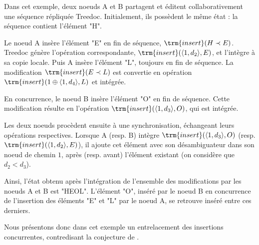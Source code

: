 Dans cet exemple, deux noeuds A et B partagent et éditent collaborativement une séquence répliquée Treedoc.
Initialement, ils possèdent le même état : la séquence contient l'élément "H".

Le noeud A insère l'élément "E" en fin de séquence, \ie $\trm{insert}(H \prec E)$.
Treedoc génère l'opération correspondante, $\trm{insert}(\langle 1,d_2 \rangle, E)$, et l'intègre à sa copie locale.
Puis A insère l'élément "L", toujours en fin de séquence.
La modification $\trm{insert}(E \prec L)$ est convertie en opération $\trm{insert}(1 \oplus \langle 1,d_4 \rangle, L)$ et intégrée.

En concurrence, le noeud B insère l'élément "O" en fin de séquence.
Cette modification résulte en l'opération $\trm{insert}(\langle 1,d_3 \rangle, O)$, qui est intégrée.

Les deux noeuds procèdent ensuite à une synchronisation, échangeant leurs opérations respectives.
Lorsque A (resp. B) intègre $\trm{insert}(\langle 1,d_3 \rangle, O)$ (resp. $\trm{insert}(\langle 1,d_2 \rangle, E)$), il ajoute cet élément avec son désambiguateur dans son noeud de chemin $1$, après (resp. avant) l'élément existant (on considère que $d_2 < d_3$).

Ainsi, l'état obtenu après l'intégration de l'ensemble des modifications par les noeuds A et B est "HEOL".
L'élément "O", inséré par le noeud B en concurrence de l'insertion des éléments "E" et "L" par le noeud A, se retrouve inséré entre ces derniers.

Nous présentons donc dans cet exemple un entrelacement des insertions concurrentes, contredisant la conjecture de \cite{2019-interleaving-anomalies-collaborative-editors-kleppmann}.
